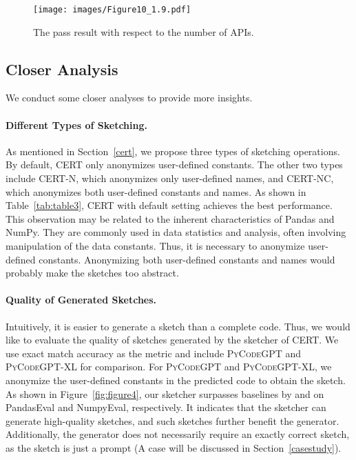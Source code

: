 \documentclass{article}
\newcommand{\cert}{\textsc{CERT}\xspace}
\newcommand{\peval}{PandasEval\xspace}
\newcommand{\neval}{NumpyEval\xspace}
\newcommand{\codepy}{\textsc{PyCodeGPT}\xspace}
\newcommand{\codepyxl}{\textsc{PyCodeGPT}-XL\xspace}
\newcommand{\pandas}{Pandas\xspace}
\newcommand{\numpy}{NumPy\xspace}
\begin{document}
\begin{figure}[t]
    \small
    \centering
    \texttt{[image: images/Figure10\_1.9.pdf]}
\caption{The pass result with respect to the number of APIs.
    }
    \label{fig:figure10}
\end{figure}

\subsection{Closer Analysis}
We conduct some closer analyses to provide more insights.

\paragraph{Different Types of Sketching.}
As mentioned in Section~\ref{cert}, we propose three types of sketching operations. By default, \cert only anonymizes user-defined constants. The other two types include \cert-N, which anonymizes only user-defined names, and \cert-NC, which anonymizes both user-defined constants and names. As shown in Table~\ref{tab:table3}, \cert with default setting achieves the best performance. This observation may be related to the inherent characteristics of \pandas and \numpy. They are commonly used in data statistics and analysis, often involving manipulation of the data constants. Thus, it is necessary to anonymize user-defined constants. Anonymizing both user-defined constants and names would probably make the sketches too abstract.

\paragraph{Quality of Generated Sketches.}
Intuitively, it is easier to generate a sketch than a complete code. Thus, we would like to evaluate the quality of sketches generated by the sketcher of \cert. We use exact match accuracy as the metric and include \codepy and \codepyxl for comparison. For \codepy and \codepyxl, we anonymize the user-defined constants in the predicted code to obtain the sketch. As shown in Figure~\ref{fig:figure4}, our sketcher surpasses baselines by  and  on \peval and \neval, respectively. It indicates that the sketcher can generate high-quality sketches, and such sketches further benefit the generator. Additionally, the generator does not necessarily require an exactly correct sketch, as the sketch is just a prompt (A case will be discussed in Section~\ref{casestudy}). 
\end{document}

